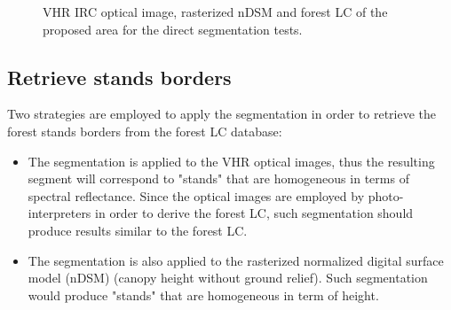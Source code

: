 \begin{figure}[htbp]
\begin{center}
\begingroup
\captionsetup[subfigure]{width=0.16\textwidth}
\endgroup
\caption{VHR IRC optical image, rasterized nDSM and forest LC of the proposed area for the direct segmentation tests.}
\label{fig:data_direct_seg}
\end{center}
\end{figure}

\subsection{Retrieve stands borders}
\label{sec:C3_S2_ss1}
Two strategies are employed to apply the segmentation in order to retrieve the forest stands borders from the forest LC database:
\begin{itemize}
\item The segmentation is applied to the VHR optical images, thus the resulting segment will correspond to "stands" that are homogeneous in terms of spectral reflectance. Since the optical images are employed by photo-interpreters in order to derive the forest LC, such segmentation should produce results similar to the forest LC.
\item The segmentation is also applied to the rasterized normalized digital surface model (nDSM) (canopy height without ground relief). Such segmentation would produce "stands" that are homogeneous in term of height.
\end{itemize}

